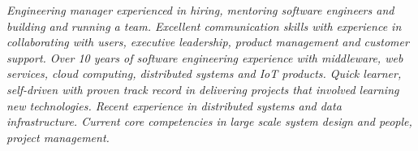 {\selectfont
\textit{Engineering manager experienced in hiring, mentoring software engineers and building and running a team. Excellent communication skills with experience in collaborating with users, executive leadership, product management and customer support. Over 10 years of software engineering experience with middleware, web services, cloud computing, distributed systems and IoT products. Quick learner, self-driven with proven track record in delivering projects that involved learning new technologies. Recent experience in distributed systems and data infrastructure. Current core competencies in large scale system design and people, project management.}
}